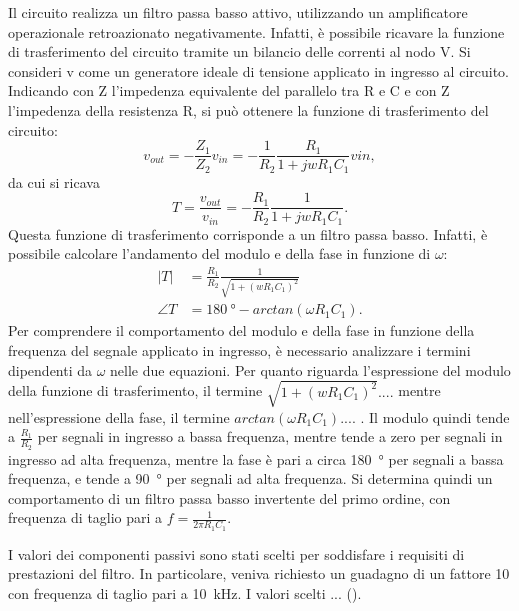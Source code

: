 Il circuito realizza un filtro passa basso attivo, utilizzando un amplificatore operazionale retroazionato negativamente. Infatti, è possibile ricavare la funzione di trasferimento del circuito tramite un bilancio delle correnti al nodo V\super{-}. Si consideri v come un generatore ideale di tensione applicato in ingresso al circuito. Indicando con Z l'impedenza equivalente del parallelo tra R e C e con Z l'impedenza della resistenza R, si può ottenere la funzione di trasferimento del circuito:
\begin{equation}
	v_{out}=-\frac{Z_1}{Z_2}v_{in}=-\frac{1}{R_2}\frac{R_1}{1+j w R_1 C_1} vin,
\end{equation}
da cui si ricava
\begin{equation}
	T=\frac{v_{out}}{v_{in}}=-\frac{R_1}{R_2}\frac{1}{1+j w R_1 C_1}.
\end{equation}
Questa funzione di trasferimento corrisponde a un filtro passa basso. Infatti, è possibile calcolare l'andamento del modulo e della fase in funzione di $\omega$:
\begin{equation}
	\begin{split}
		|T|&=\frac{R_1}{R_2}\frac{1}{\sqrt{1+(wR_1C_1)^2}} \\
		\angle T&=\SI{180}{\degree}-arctan(\omega R_1 C_1).
	\end{split}
\end{equation}
Per comprendere il comportamento del modulo e della fase in funzione della frequenza del segnale applicato in ingresso, è necessario analizzare i termini dipendenti da $\omega$ nelle due equazioni. Per quanto riguarda l'espressione del modulo della funzione di trasferimento, il termine $\sqrt{1+(wR_1C_1)^2}.... $  mentre nell'espressione della fase, il termine $arctan(\omega R_1 C_1)....$ . Il modulo quindi tende a $\frac{R_1}{R_2}$ per segnali in ingresso a bassa frequenza, mentre tende a zero per segnali in ingresso ad alta frequenza, mentre la fase è pari a circa \SI{180}{\degree} per segnali a bassa frequenza, e tende a \SI{90}{\degree} per segnali ad alta frequenza.
Si determina quindi un comportamento di un filtro passa basso invertente del primo ordine, con frequenza di taglio pari a $f=\frac{1}{2\pi R_1C_1}$.

I valori dei componenti passivi sono stati scelti per soddisfare i requisiti di prestazioni del filtro. In particolare, veniva richiesto un guadagno di un fattore 10 con frequenza di taglio pari a \SI{10}{\kilo\hertz}. I valori scelti ... ().

